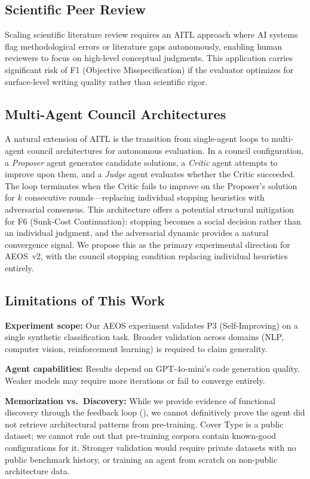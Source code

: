 \documentclass[11pt]{article}
\begin{document}
\subsection{Scientific Peer Review}

Scaling scientific literature review requires an AITL approach where AI systems flag methodological errors or literature gaps autonomously, enabling human reviewers to focus on high-level conceptual judgments. This application carries significant risk of F1 (Objective Misspecification) if the evaluator optimizes for surface-level writing quality rather than scientific rigor.

\subsection{Multi-Agent Council Architectures}

A natural extension of AITL is the transition from single-agent loops to multi-agent council architectures for autonomous evaluation. In a council configuration, a \emph{Proposer} agent generates candidate solutions, a \emph{Critic} agent attempts to improve upon them, and a \emph{Judge} agent evaluates whether the Critic succeeded. The loop terminates when the Critic fails to improve on the Proposer's solution for $k$ consecutive rounds---replacing individual stopping heuristics with adversarial consensus. This architecture offers a potential structural mitigation for F6 (Sunk-Cost Continuation): stopping becomes a social decision rather than an individual judgment, and the adversarial dynamic provides a natural convergence signal. We propose this as the primary experimental direction for AEOS~v2, with the council stopping condition replacing individual heuristics entirely.

\subsection{Limitations of This Work}

\textbf{Experiment scope:} Our AEOS experiment validates P3 (Self-Improving) on a single synthetic classification task. Broader validation across domains (NLP, computer vision, reinforcement learning) is required to claim generality.

\textbf{Agent capabilities:} Results depend on GPT-4o-mini's code generation quality. Weaker models may require more iterations or fail to converge entirely.

\textbf{Memorization vs.\ Discovery:} While we provide evidence of functional discovery through the feedback loop (), we cannot definitively prove the agent did not retrieve architectural patterns from pre-training. Cover Type is a public dataset; we cannot rule out that pre-training corpora contain known-good configurations for it. Stronger validation would require private datasets with no public benchmark history, or training an agent from scratch on non-public architecture data.
\end{document}
